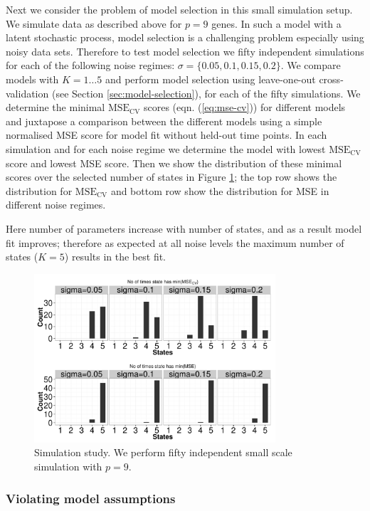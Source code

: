 Next we consider the problem of model selection in this small simulation setup. We simulate data as described above for $p=9$ genes. In such a model with a latent stochastic process, model selection is a challenging problem especially using noisy data sets. Therefore to test model selection we fifty independent simulations for each of the following noise regimes: $\sigma = \lbrace 0.05, 0.1, 0.15, 0.2 \rbrace $. We compare models with $K = 1 \ldots 5$ and perform model selection using leave-one-out cross-validation (see Section \ref{sec:model-selection}), for each of the fifty simulations. We determine the minimal $\mathrm{MSE_{CV}}$ scores (eqn. (\ref{eq:mse-cv})) for different models and juxtapose a comparison between the different models using a simple normalised MSE score for model fit without held-out time points. In each simulation and for each noise regime we determine the model with lowest $\mathrm{MSE_{CV}}$ score and lowest MSE score. Then we show the distribution of these minimal scores over the selected number of states in Figure \ref{fig:small-scale-modelSlct}; the top row shows the distribution for $\mathrm{MSE_{CV}}$ and bottom row show the distribution for MSE in different noise regimes. 

Here number of parameters increase with number of states, and as a result model fit improves; therefore as expected at all noise levels the maximum number of states ($K=5$) results in the best fit. 

\begin{figure}
  \centering
  \includegraphics[width=0.8\textwidth]{pics/hist-all.pdf}
  \caption{Simulation study. We perform fifty independent small scale simulation with $p=9$. }
  \label{fig:small-scale-modelSlct}
\end{figure}

\subsubsection{Violating model assumptions}
\label{sec:viol-model-assumpt}

